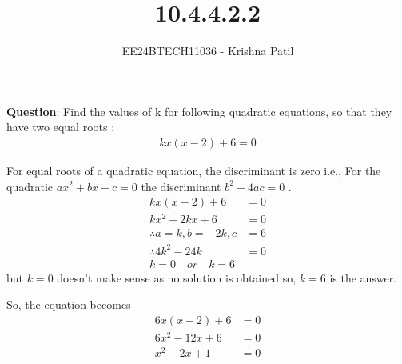 \documentclass[journal]{IEEEtran}
\begin{document}

\vspace{3cm}

\title{10.4.4.2.2}
\author{EE24BTECH11036 - Krishna Patil}
{\let\newpage\relax\maketitle}

\renewcommand{\thefigure}{\theenumi}
\renewcommand{\thetable}{\theenumi}
\setlength{\intextsep}{10pt} %

\renewcommand{\thefigure}{\theenumi}
\renewcommand{\thetable}{\theenumi}
\setlength{\intextsep}{10pt} %

\textbf{Question}: Find the values of k for following quadratic equations, so that they have two equal roots : 
\begin{align}
	kx(x-2) + 6 = 0
\end{align}

\solution
For equal roots of a quadratic equation, the discriminant is zero i.e., For the quadratic $ax^2 + bx + c =0$ the discriminant $b^2 - 4ac = 0$ .
\begin{align}
	kx(x-2) + 6 &= 0 \\
	kx^2 -2kx + 6 &= 0 \\
	\therefore a = k, b = -2k, c &= 6 \\ 
	\therefore 4k^2 -24k &= 0 \\
	k = 0 \quad or \quad k = 6
\end{align}
but $k = 0$ doesn't make sense as no solution is obtained so, $k = 6$ is the answer. 

So, the equation becomes
\begin{align}
	6x(x-2) + 6 &= 0 \\
	6x^2 - 12x + 6 &= 0 \\
	x^2 - 2x + 1 &= 0
\end{align}
\end{document}
